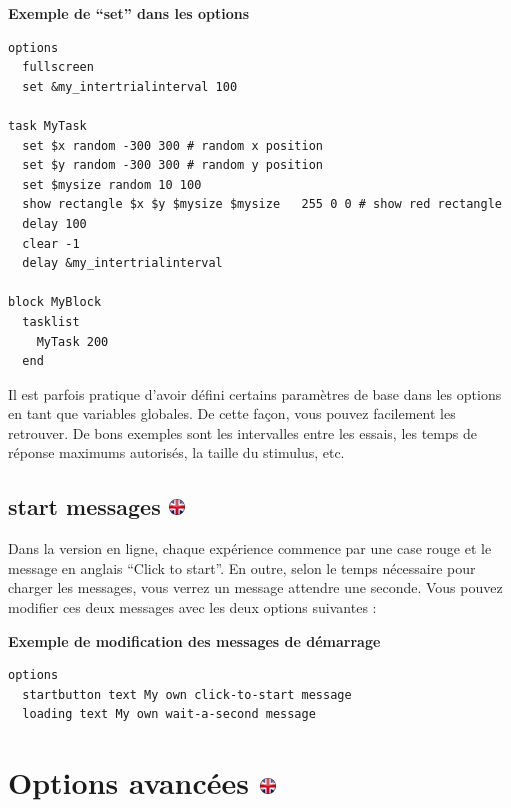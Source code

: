 \documentclass[
]{book}
\begin{document}
\textbf{Exemple de ``set'' dans les options}

\begin{verbatim}
options
  fullscreen
  set &my_intertrialinterval 100

task MyTask
  set $x random -300 300 # random x position
  set $y random -300 300 # random y position
  set $mysize random 10 100
  show rectangle $x $y $mysize $mysize   255 0 0 # show red rectangle
  delay 100
  clear -1
  delay &my_intertrialinterval

block MyBlock
  tasklist
    MyTask 200
  end
\end{verbatim}

Il est parfois pratique d'avoir défini certains paramètres de base dans les options en tant que variables globales. De cette façon, vous pouvez facilement les retrouver. De bons exemples sont les intervalles entre les essais, les temps de réponse maximums autorisés, la taille du stimulus, etc.

\hypertarget{start-messages}{%
\subsection[start messages ]{\texorpdfstring{start messages \href{https://www.psytoolkit.org/doc3.4.0/syntax.html\#options-start-messages}{\protect\includegraphics{img/ukflag.png}}}{start messages }}\label{start-messages}}

Dans la version en ligne, chaque expérience commence par une case rouge et le message en anglais ``Click to start''. En outre, selon le temps nécessaire pour charger les messages, vous verrez un message attendre une seconde. Vous pouvez modifier ces deux messages avec les deux options suivantes :

\textbf{Exemple de modification des messages de démarrage}

\begin{verbatim}
options
  startbutton text My own click-to-start message
  loading text My own wait-a-second message
\end{verbatim}

\hypertarget{options-avancuxe9es}{%
\section[Options avancées ]{\texorpdfstring{Options avancées \href{https://www.psytoolkit.org/doc3.4.0/syntax.html\#advanced_options}{\protect\includegraphics{img/ukflag.png}}}{Options avancées }}\label{options-avancuxe9es}}
\end{document}
